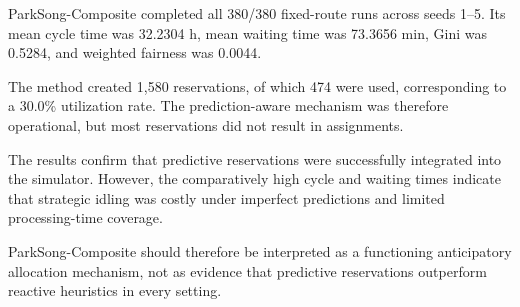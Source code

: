 ParkSong-Composite completed all 380/380 fixed-route runs across seeds 1–5. Its mean cycle time was
32.2304 h, mean waiting time was 73.3656 min, Gini was 0.5284, and weighted fairness was 0.0044.

The method created 1,580 reservations, of which 474 were used, corresponding to a 30.0\% utilization rate.
The prediction-aware mechanism was therefore operational, but most reservations did not result in assignments.

The results confirm that predictive reservations were successfully integrated into the simulator. However, the
comparatively high cycle and waiting times indicate that strategic idling was costly under imperfect predictions
and limited processing-time coverage.

ParkSong-Composite should therefore be interpreted as a functioning anticipatory allocation mechanism, not as
evidence that predictive reservations outperform reactive heuristics in every setting.